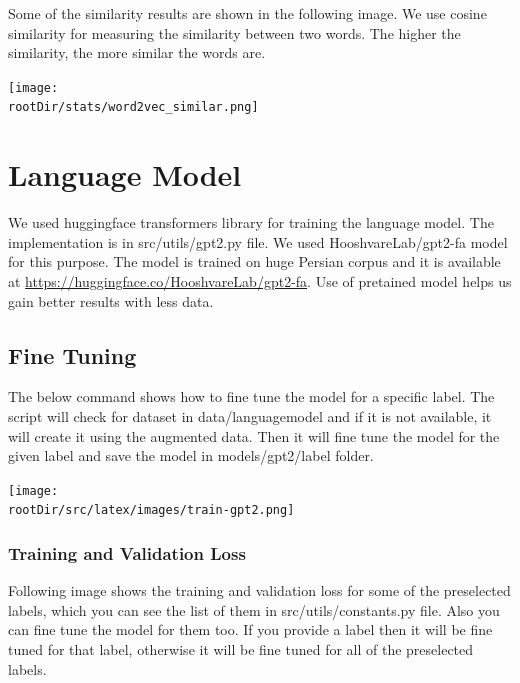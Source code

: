 \documentclass[12pt, letterpaper]{article}
\def\rootDir{../..}
\begin{document}
    Some of the similarity results are shown in the following image. We use cosine similarity for measuring the similarity between two words. The higher the similarity, the more similar the words are.
    \begin{center}
        \texttt{[image: \\rootDir/stats/word2vec\_similar.png]}
    \end{center}

    \section{Language Model}\label{sec:language-model}
    We used huggingface transformers library for training the language model. The implementation is in src\slash utils\slash gpt2.py file. We used HooshvareLab/gpt2-fa model for this purpose. The model is trained on huge Persian corpus and it is available at \url{https://huggingface.co/HooshvareLab/gpt2-fa}. Use of pretained model helps us gain better results with less data.
    
    \subsection{Fine Tuning}\label{subsec:fine-tuning}
    The below command shows how to fine tune the model for a specific label. The script will check for dataset in data\slash languagemodel and if it is not available, it will create it using the augmented data. Then it will fine tune the model for the given label and save the model in models\slash gpt2\slash label folder.
    \begin{center}
        \texttt{[image: \\rootDir/src/latex/images/train-gpt2.png]}
    \end{center}

    \subsubsection{Training and Validation Loss}\label{subsubsec:training-and-validation-loss}
    Following image shows the training and validation loss for some of the preselected labels, which you can see the list of them in src\slash utils\slash constants.py file. Also you can fine tune the model for them too. If you provide a label then it will be fine tuned for that label, otherwise it will be fine tuned for all of the preselected labels.
    \begin{figure}[H]
        \centering
        
    \end{figure}
\end{document}
